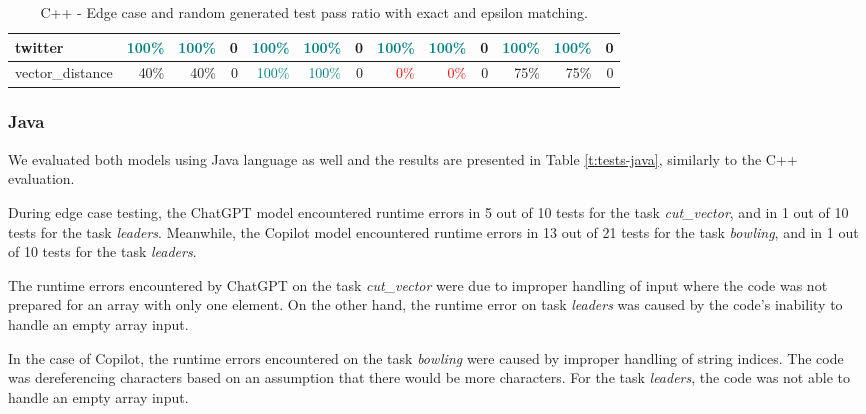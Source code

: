 \begin{table}[!h]
{\begin{tabular}{|p{2.9cm}|rr|r|rr|r||rr|r|rr|r|}
		twitter            & \textcolor{teal}{100\%}          & \multicolumn{1}{r|}{\textcolor{teal}{100\%}}          & \cellcolor[HTML]{FFFFFF}0   & \textcolor{teal}{100\%}          & \multicolumn{1}{r|}{\textcolor{teal}{100\%}}          & \cellcolor[HTML]{FFFFFF}0   & \textcolor{teal}{100\%}     & \multicolumn{1}{r|}{\textcolor{teal}{100\%}} & \cellcolor[HTML]{FFFFFF}0    & \textcolor{teal}{100\%}          & \multicolumn{1}{r|}{\textcolor{teal}{100\%}}          & \cellcolor[HTML]{FFFFFF}0    \\ \hline
		vector\_distance   & 40\%                             & \multicolumn{1}{r|}{40\%}                             & \cellcolor[HTML]{FFFFFF}0   & \textcolor{teal}{100\%}          & \multicolumn{1}{r|}{\textcolor{teal}{100\%}}          & \cellcolor[HTML]{FFFFFF}0   & \textcolor{red}{0\%}        & \multicolumn{1}{r|}{\textcolor{red}{0\%}}    & \cellcolor[HTML]{FFFFFF}0    & 75\%                             & \multicolumn{1}{r|}{75\%}                             & \cellcolor[HTML]{FFFFFF}0    \\ \hline
	\end{tabular}
  }
	\vspace{2px}
	\caption{C++ - Edge case and random generated test pass ratio with exact and epsilon matching.}
	\label{t:tests-cpp}
	
\end{table}

\subsubsection{Java}
We evaluated both models using Java language as well and the results are presented in Table \ref{t:tests-java}, similarly to the C++ evaluation.

During edge case testing, the ChatGPT model encountered runtime errors in 5 out of 10 tests for the task \textit{cut\_vector}, and in 1 out of 10 tests for the task \textit{leaders}.
Meanwhile, the Copilot model encountered runtime errors in 13 out of 21 tests for the task \textit{bowling}, and in 1 out of 10 tests for the task \textit{leaders}.

The runtime errors encountered by ChatGPT on the task \textit{cut\_vector} were due to improper handling of input where the code was not prepared for an array with only one element.
On the other hand, the runtime error on task \textit{leaders} was caused by the code's inability to handle an empty array input.

In the case of Copilot, the runtime errors encountered on the task \textit{bowling} were caused by improper handling of string indices.
The code was dereferencing characters based on an assumption that there would be more characters.
For the task \textit{leaders}, the code was not able to handle an empty array input.

